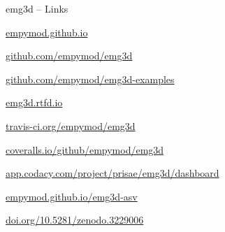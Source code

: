 \documentclass[xcolor=svgnames, aspectratio=169]{beamer}
\begin{document}
  \begin{frame}%
    {emg3d -- Links}
    \centering
    \begin{description}[labelindent=4cm]
      \item[Website:] \href{https://empymod.github.io}{empymod.github.io}
      \item[Code:]
        \href{https://github.com/empymod/emg3d}{github.com/empymod/emg3d}
      \item[Examples:]
        \href{https://github.com/empymod/emg3d-examples}%
        {github.com/empymod/emg3d-examples}
      \item[Docs:] \href{https://emg3d.readthedocs.io/en/latest}{emg3d.rtfd.io}
      \item[Travis:]
        \href{https://travis-ci.org/empymod/emg3d}{travis-ci.org/empymod/emg3d}
      \item[Coveralls:]
        \href{https://coveralls.io/github/empymod/emg3d}%
        {coveralls.io/github/empymod/emg3d}
      \item[Codacy:]
        \href{https://app.codacy.com/project/prisae/emg3d/dashboard}%
        {app.codacy.com/project/prisae/emg3d/dashboard}
      \item[Benchmarks:]
        \href{https://empymod.github.io/emg3d-asv}{empymod.github.io/emg3d-asv}
      \item[Zenodo:]
        \href{https://doi.org/10.5281/zenodo.3229006}%
        {doi.org/10.5281/zenodo.3229006}
    \end{description}
  \end{frame}
\end{document}
